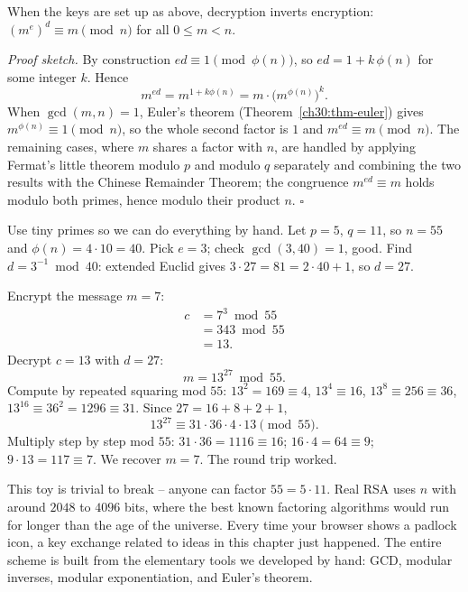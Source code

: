 \begin{theorem}
\label{ch30:thm-rsa}
When the keys are set up as above, decryption inverts encryption:
$(m^e)^d \equiv m \pmod n$ for all $0 \le m < n$.
\end{theorem}

\begin{formalbox}
\textit{Proof sketch.} By construction $ed \equiv 1 \pmod{\phi(n)}$, so $ed = 1 +
k\,\phi(n)$ for some integer $k$. Hence
\[
  m^{ed} = m^{1 + k\phi(n)} = m \cdot \bigl(m^{\phi(n)}\bigr)^{k}.
\]
When $\gcd(m,n) = 1$, Euler's theorem (Theorem~\ref{ch30:thm-euler}) gives
$m^{\phi(n)} \equiv 1 \pmod n$, so the whole second factor is $1$ and $m^{ed}
\equiv m \pmod n$. The remaining cases, where $m$ shares a factor with $n$, are
handled by applying Fermat's little theorem modulo $p$ and modulo $q$ separately
and combining the two results with the Chinese Remainder Theorem;
the congruence $m^{ed} \equiv m$ holds modulo both primes, hence modulo their
product $n$. \hfill$\square$
\end{formalbox}

\begin{example}
\label{ch30:ex-rsa}
Use tiny primes so we can do everything by hand. Let $p = 5$, $q = 11$, so $n =
55$ and $\phi(n) = 4 \cdot 10 = 40$. Pick $e = 3$; check $\gcd(3,40) = 1$, good.
Find $d = 3^{-1} \bmod 40$: extended Euclid gives $3 \cdot 27 = 81 = 2\cdot 40 +
1$, so $d = 27$.

Encrypt the message $m = 7$:
\begin{align*}
  c &= 7^{3} \bmod 55 \\
    &= 343 \bmod 55 \\
    &= 13.
\end{align*}
Decrypt $c = 13$ with $d = 27$:
\[
  m = 13^{27} \bmod 55.
\]
Compute by repeated squaring mod $55$: $13^2 = 169 \equiv 4$, $13^4 \equiv 16$,
$13^8 \equiv 256 \equiv 36$, $13^{16} \equiv 36^2 = 1296 \equiv 31$. Since $27 =
16 + 8 + 2 + 1$,
\[
  13^{27} \equiv 31 \cdot 36 \cdot 4 \cdot 13 \pmod{55}.
\]
Multiply step by step mod $55$: $31\cdot 36 = 1116 \equiv 16$;
$16 \cdot 4 = 64 \equiv 9$; $9 \cdot 13 = 117 \equiv 7$. We
recover $m = 7$. The round trip worked.
\end{example}

\begin{aestheticbox}
This toy is trivial to break -- anyone can factor $55 = 5\cdot 11$. Real RSA
uses $n$ with around $2048$ to $4096$ bits, where the best known factoring
algorithms would run for longer than the age of the universe. Every time your
browser shows a padlock icon, a key exchange related to ideas in this chapter
just happened. The entire scheme is built from the
elementary tools we developed by hand: GCD, modular inverses, modular
exponentiation, and Euler's theorem.
\end{aestheticbox}

